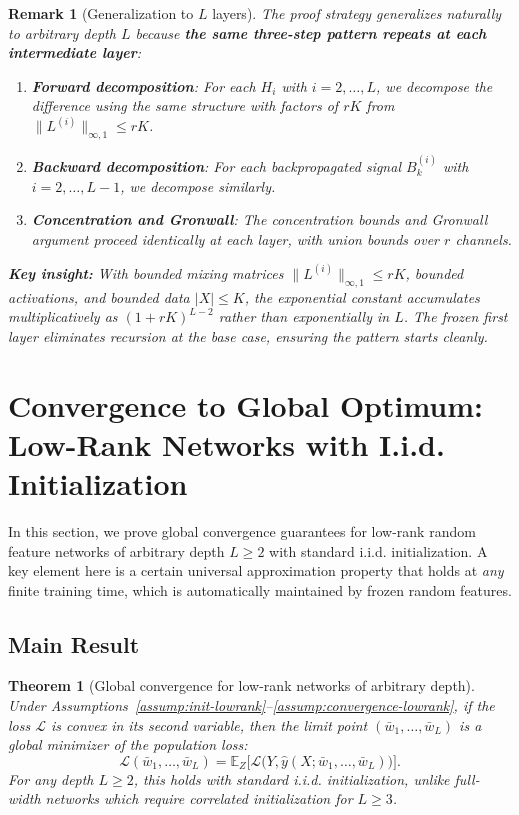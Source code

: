 \documentclass[11pt]{article}
\newcommand{\E}{\mathbb{E}}
\newcommand{\1}{\mathbbm{1}}
\newtheorem{theorem}{Theorem}
\newtheorem{remark}{Remark}
\begin{document}
\begin{remark}[Generalization to $L$ layers]
\label{rem:generalization-L}
The proof strategy generalizes naturally to arbitrary depth $L$ because \textbf{the same three-step pattern repeats at each intermediate layer}:

\begin{enumerate}
\item \textbf{Forward decomposition}: For each $H_i$ with $i = 2, \ldots, L$, we decompose the difference using the same structure with factors of $rK$ from $\|L^{(i)}\|_{\infty,1} \le rK$.

\item \textbf{Backward decomposition}: For each backpropagated signal $B_k^{(i)}$ with $i = 2, \ldots, L-1$, we decompose similarly.

\item \textbf{Concentration and Gronwall}: The concentration bounds and Gronwall argument proceed identically at each layer, with union bounds over $r$ channels.
\end{enumerate}

\textbf{Key insight:} With bounded mixing matrices $\|L^{(i)}\|_{\infty,1} \le rK$, bounded activations, and bounded data $|X| \le K$, the exponential constant accumulates multiplicatively as $(1+rK)^{L-2}$ rather than exponentially in $L$. The frozen first layer eliminates recursion at the base case, ensuring the pattern starts cleanly.
\end{remark}

\section{Convergence to Global Optimum: Low-Rank Networks with I.i.d. Initialization}
\label{sec:global_convergence_iid}

In this section, we prove global convergence guarantees for low-rank random feature networks of arbitrary depth $L \ge 2$ with standard i.i.d. initialization. A key element here is a certain universal approximation property that holds at \textit{any} finite training time, which is automatically maintained by frozen random features.

\subsection{Main Result}

\begin{theorem}[Global convergence for low-rank networks of arbitrary depth]
\label{thm:global-convergence-lowrank}
Under Assumptions~\ref{assump:init-lowrank}--\ref{assump:convergence-lowrank}, if the loss $\mathcal{L}$ is convex in its second variable, then the limit point $(\bar{w}_1,\ldots,\bar{w}_L)$ is a global minimizer of the population loss:
\[
\mathscr{L}(\bar{w}_1,\ldots,\bar{w}_L) = \E_Z\big[\mathcal{L}\big(Y,\hat y(X;\bar{w}_1,\ldots,\bar{w}_L)\big)\big].
\]
For any depth $L \ge 2$, this holds with standard i.i.d. initialization, unlike full-width networks which require correlated initialization for $L \ge 3$.
\end{theorem}
\end{document}
